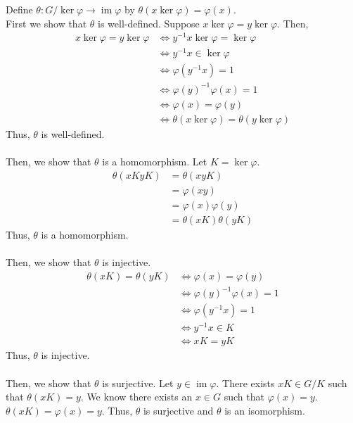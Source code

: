 \documentclass{mathnotes}
\DeclareMathOperator{\im}{im}
\begin{document}
\begin{pf}
  Define $\theta:G/\ker\varphi\to \im\varphi$ by
  $\theta(x\ker\varphi)=\varphi(x)$.\\
  First we show that $\theta$ is well-defined. Suppose
  $x\ker\varphi=y\ker\varphi$. Then,
  \begin{align*}
    x\ker\varphi=y\ker\varphi
    &\Leftrightarrow y^{-1}x\ker\varphi=\ker\varphi\\
    &\Leftrightarrow y^{-1}x\in\ker\varphi\\
    &\Leftrightarrow \varphi(y^{-1}x)=1\\
    &\Leftrightarrow \varphi(y)^{-1}\varphi(x)=1\\
    &\Leftrightarrow \varphi(x)=\varphi(y)\\
    &\Leftrightarrow \theta(x\ker\varphi)=\theta(y\ker\varphi)
  \end{align*}
  Thus, $\theta$ is well-defined.\\\\
  Then, we show that $\theta$ is a homomorphism. Let $K=\ker\varphi$.
  \begin{align*}
    \theta(xKyK)&=\theta(xyK)\\
                &=\varphi(xy)\\
                &=\varphi(x)\varphi(y)\\
                &=\theta(xK)\theta(yK)
  \end{align*}
  Thus, $\theta$ is a homomorphism.\\\\
  Then, we show that $\theta$ is injective.
  \begin{align*}
    \theta(xK)=\theta(yK)&\Leftrightarrow\varphi(x)=\varphi(y)\\
                         &\Leftrightarrow\varphi(y)^{-1}\varphi(x)=1\\
                         &\Leftrightarrow\varphi(y^{-1}x)=1\\
                         &\Leftrightarrow y^{-1}x\in K\\
                         &\Leftrightarrow xK=yK
  \end{align*}
  Thus, $\theta$ is injective.\\\\
  Then, we show that $\theta$ is surjective. Let $y\in\im\varphi$. There exists
  $xK\in G/K$ such that $\theta(xK)=y$. We know there exists an $x\in G$ such
  that $\varphi(x)=y$. $\theta(xK)=\varphi(x)=y$. Thus, $\theta$ is surjective
  and $\theta$ is an isomorphism.
\end{pf}
\end{document}
